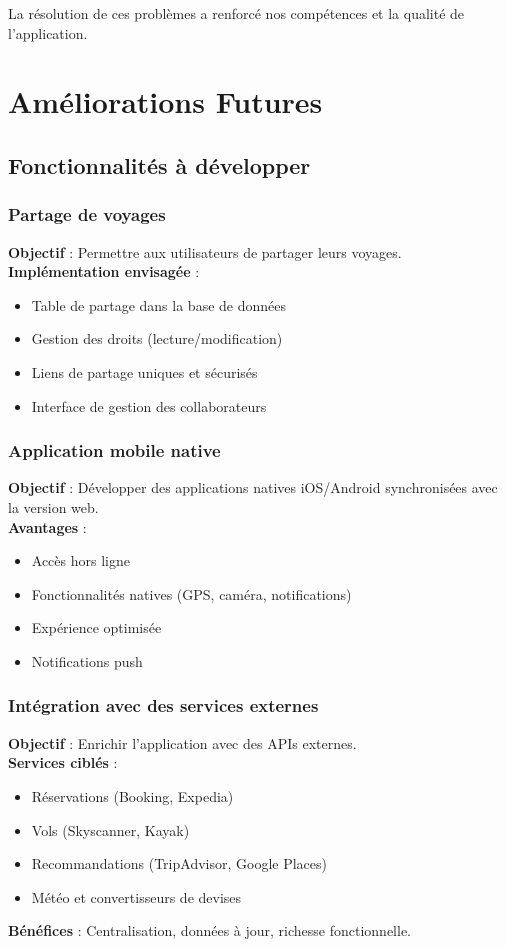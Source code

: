 \documentclass[a4paper,12pt]{article}
\begin{document}
La résolution de ces problèmes a renforcé nos compétences et la qualité de l’application.
\section{Améliorations Futures}

\subsection{Fonctionnalités à développer}

\subsubsection{Partage de voyages}
\textbf{Objectif} : Permettre aux utilisateurs de partager leurs voyages.\\
\textbf{Implémentation envisagée} :
\begin{itemize}
  \item Table de partage dans la base de données
  \item Gestion des droits (lecture/modification)
  \item Liens de partage uniques et sécurisés
  \item Interface de gestion des collaborateurs
\end{itemize}

\subsubsection{Application mobile native}
\textbf{Objectif} : Développer des applications natives iOS/Android synchronisées avec la version web.\\
\textbf{Avantages} :
\begin{itemize}
  \item Accès hors ligne
  \item Fonctionnalités natives (GPS, caméra, notifications)
  \item Expérience optimisée
  \item Notifications push
\end{itemize}

\subsubsection{Intégration avec des services externes}
\textbf{Objectif} : Enrichir l'application avec des APIs externes.\\
\textbf{Services ciblés} :
\begin{itemize}
  \item Réservations (Booking, Expedia)
  \item Vols (Skyscanner, Kayak)
  \item Recommandations (TripAdvisor, Google Places)
  \item Météo et convertisseurs de devises
\end{itemize}
\textbf{Bénéfices} : Centralisation, données à jour, richesse fonctionnelle.
\end{document}

